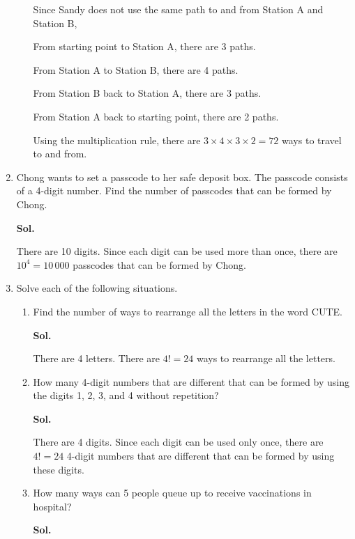\documentclass{report}
\newcommand{\sol}[1]{

      \noindent \textbf{Sol.}
}
\def\eos{\quad\hbox{\rlap{\hbox{\vrule depth 1.5pt height 2.6mm width 0.2mm \hskip 1mm \vrule height 2.6mm width 0.2mm}}{\vbox{\hrule height 0.2mm width 1.4mm \vskip 2.8mm \hrule depth 1.5pt height -0.35mm width 1.2mm}}}}
\begin{document}
\begin{multicols*}{2}
\begin{enumerate}
\begin{enumerate}
                              Since Sandy does not use the same path to and from Station A and Station B,

                              From starting point to Station A, there are 3 paths.

                              From Station A to Station B, there are 4 paths.

                              From Station B back to Station A, there are 3 paths.

                              From Station A back to starting point, there are 2 paths.

                              Using the multiplication rule, there are $3 \times 4 \times 3 \times 2 = 72$
                              ways to travel to and from. $\eos$
                  \end{enumerate}

            \item Chong wants to set a passcode to her safe deposit box. The passcode consists of
                  a 4-digit number. Find the number of passcodes that can be formed by Chong.
                  \sol{}

                  There are 10 digits. Since each digit can be used more than once, there are
                  $10^4 = 10\,000$ passcodes that can be formed by Chong. $\eos$

            \item Solve each of the following situations.
                  \begin{enumerate}
                        \item Find the number of ways to rearrange all the letters in the word CUTE. \sol{}

                              There are 4 letters. There are $4! = 24$ ways to rearrange all the letters.
                              $\eos$

                        \item How many 4-digit numbers that are different that can be formed by using the
                              digits 1, 2, 3, and 4 without repetition? \sol{}

                              There are 4 digits. Since each digit can be used only once, there are $4! = 24$
                              4-digit numbers that are different that can be formed by using these digits.
                              $\eos$

                        \item How many ways can 5 people queue up to receive vaccinations in hospital? \sol{}


\end{enumerate}
\end{enumerate}
\end{multicols*}
\end{document}
